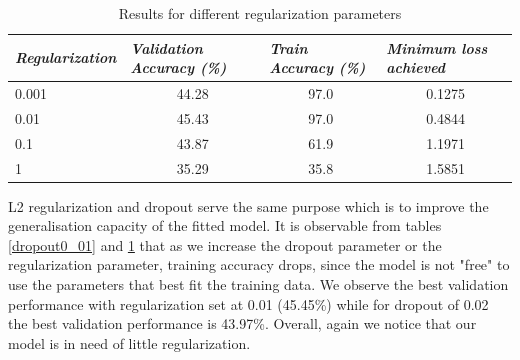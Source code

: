 \documentclass[12pt,twoside]{article}
\begin{document}
\begin{table}[!htbp]
\centering
\begin{tabular}{|l|c|c|c|}
\hline
\textit{\textbf{Regularization}} & \multicolumn{1}{l|}{\textit{\textbf{Validation Accuracy (\%)}}} & \multicolumn{1}{l|}{\textit{\textbf{Train Accuracy (\%)}}} & \multicolumn{1}{l|}{\textit{\textbf{Minimum loss achieved}}} \\ \hline
0.001                            & 44.28                                                           & 97.0                                                       & 0.1275                                                       \\ \hline
0.01                             & 45.43                                                           & 97.0                                                       & 0.4844                                                       \\ \hline
0.1                              & 43.87                                                           & 61.9                                                       & 1.1971                                                       \\ \hline
1                                & 35.29                                                           & 35.8                                                       & 1.5851                                                       \\ \hline
\end{tabular}
\caption{Results for different regularization parameters}
\label{regularization}
\end{table}

L2 regularization and dropout serve the same purpose which is to improve the generalisation capacity of the fitted model. It is observable from tables \ref{dropout0_01} and \ref{regularization} that as we increase the dropout parameter or the regularization parameter, training accuracy drops, since the model is not "free" to use the parameters that best fit the training data. We observe the best validation performance with regularization set at 0.01 (45.45\%) while for dropout of 0.02 the best validation performance is 43.97\%. Overall, again we notice that our model is in need of little regularization.
\end{document}
